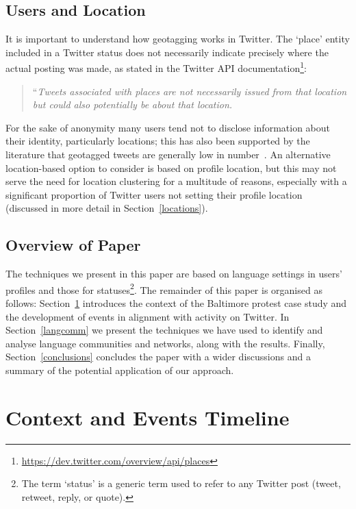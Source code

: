 \documentclass[conference]{IEEEtran}
\begin{document}
\subsection{Users and Location}

It is important to understand how geotagging works in Twitter. The
`place' entity included in a Twitter status does not necessarily
indicate precisely where the actual posting was made, as stated in the
Twitter API
documentation\footnote{\url{https://dev.twitter.com/overview/api/places}}:

\begin{quotation} ``{\emph{Tweets associated with places are not
necessarily issued from that location but could also potentially be
about that location.}}
\end{quotation}

For the sake of anonymity many users tend not to disclose information
about their identity, particularly locations; this has also been
supported by the literature that geotagged tweets are generally low in
number~\cite{kang-et-al:2013}. An alternative location-based option to
consider is based on profile location, but this may not serve the need
for location clustering for a multitude of reasons, especially with a
significant proportion of Twitter users not setting their profile
location~\cite{graham-et-al:2014} (discussed in more detail in
Section~\ref{locations}).

\subsection{Overview of Paper}

The techniques we present in this paper are based on language settings
in users' profiles and those for statuses\footnote{The term `status'
is a generic term used to refer to any Twitter post (tweet, retweet,
reply, or quote).}. The remainder of this paper is organised as
follows: Section~\ref{context} introduces the context of the Baltimore
protest case study and the development of events in alignment with
activity on Twitter. In Section~\ref{langcomm} we present the
techniques we have used to identify and analyse language communities
and networks, along with the results. Finally,
Section~\ref{conclusions} concludes the paper with a wider discussions
and a summary of the potential application of our approach.


\section{Context and Events Timeline}\label{context}
\end{document}
